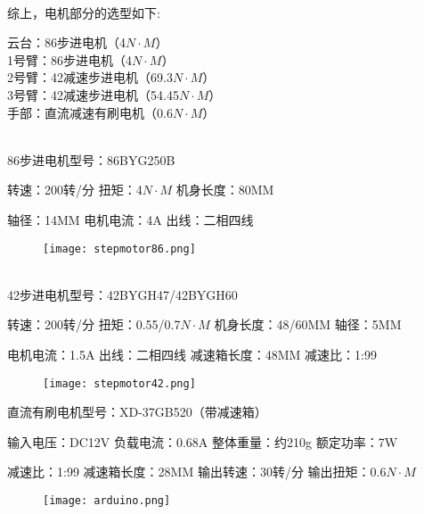 ~\\

综上，电机部分的选型如下:
\begin{minipage}[t]{0.9\linewidth}
  云台：86步进电机（4$N\cdot M$）
\\1号臂：86步进电机（4$N\cdot M$）
\\2号臂：42减速步进电机（69.3$N\cdot M$）
\\3号臂：42减速步进电机（54.45$N\cdot M$）
\\手部：直流减速有刷电机（0.6$N\cdot M$）
\end{minipage}
\\


    86步进电机型号：86BYG250B 
   
    转速：200转/分   \qquad \qquad 扭矩：4$N\cdot M$ \qquad \qquad 机身长度：80MM  
     
    轴径：14MM \qquad \qquad 电机电流：4A \qquad \qquad 出线：二相四线 
    \begin{figure}[!htp]
        \centering
          \texttt{[image: stepmotor86.png]}
          \label{fig:86}
    \end{figure}
~\\

    42步进电机型号：42BYGH47/42BYGH60
     
    转速：200转/分  \qquad  扭矩：0.55/0.7$N\cdot M$ \qquad  机身长度：48/60MM  \qquad 轴径：5MM
    
    电机电流：1.5A \qquad  出线：二相四线 \qquad  减速箱长度：48MM  \qquad  减速比：1:99
    \begin{figure}[!htp]
        \centering
        \texttt{[image: stepmotor42.png]}
        \label{fig:42}
    \end{figure}



        直流有刷电机型号：XD-37GB520（带减速箱）
        
        输入电压：DC12V \qquad 负载电流：0.68A \qquad 整体重量：约210g \qquad 额定功率：7W

        减速比：1:99 \qquad 减速箱长度：28MM \qquad  输出转速：30转/分 \quad  输出扭矩：0.6$N\cdot M$
        \begin{figure}[!htp]
        \centering
        \texttt{[image: arduino.png]}
        \label{fig:DCmotor}
        \end{figure}
        
